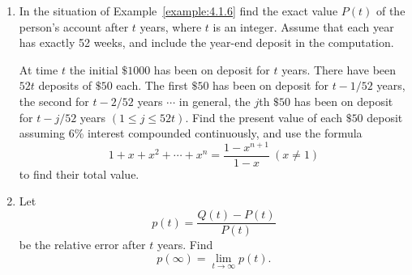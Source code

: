 \documentclass{ximera}
\begin{document}
\begin{problem}\label{exer:4.1.21}

\begin{enumerate}
\item %
 In the situation of Example~\ref{example:4.1.6}
find the exact value $P(t)$ of the person's account after $t$
years, where $t$ is an integer.  Assume that each year has
exactly 52 weeks, and include the year-end
deposit in the computation.

\begin{hint} 
At time $t$ the initial $\$1000$
has been on deposit for $t$ years.  There have been $52t$
deposits of $\$50$ each.  The first $\$50$ has been on deposit
for $t-1/52$ years, the second for $t-2/52$ years $\cdots$
in general, the $j$th $\$50$ has been on deposit for $t-j/52$
years $(1 \le j \le 52t)$.  Find the present value of each
$\$50$ deposit assuming $6$\% interest compounded
continuously, and use the formula
$$
1+x+x^2+\cdots+x^n=\frac{1-x^{n+1}}{1-x}\
(x \ne 1)
$$
to find their total value.
\end{hint}

\item %
 Let
$$
p(t)=\frac{Q(t)-P(t)}{P(t)}
$$
be the relative error after $t$ years.  Find
$$
p(\infty)=\lim_{t\to\infty}p(t).
$$
\end{enumerate}
\end{problem}
\end{document}
